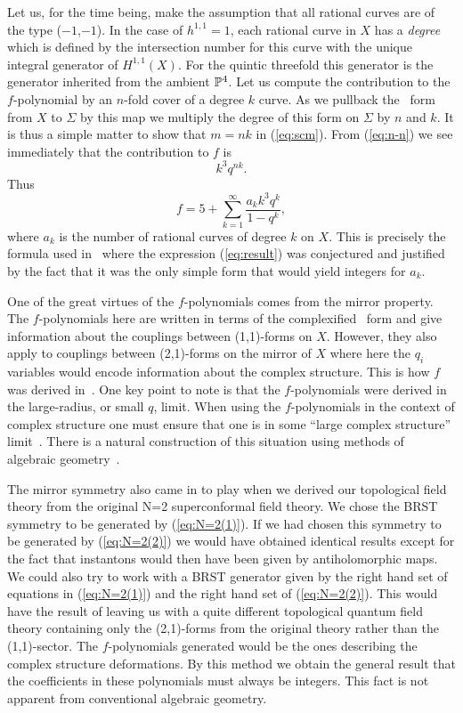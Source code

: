 Let us, for the time being, make the assumption that all rational
curves are of the type ($-1$,$-1$).
In the case of $h^{1,1}=1$, each rational curve in $X$ has a {\em
degree\/} which is defined by the intersection number for this curve
with the unique integral generator of $H^{1,1}(X)$. For the quintic
threefold this generator is the generator inherited from the ambient
$\Bbb{P}^{4}$.  Let us compute the
contribution to the $f$-polynomial by an $n$-fold cover of a degree
$k$ curve. As we pullback the \K\ form from $X$ to $\Sigma$ by this
map we multiply the degree of this form on $\Sigma$ by $n$ and $k$. It
is thus a simple matter to show that $m=nk$ in (\ref{eq:scm}). From
(\ref{eq:n-n}) we see immediately that the contribution to $f$ is
\begin{equation}
  k^3q^{nk}. \label{eq:result}
\end{equation}
Thus
\begin{equation}
  f = 5+\sum_{k=1}^\infty\frac{a_kk^3q^k}{1-q^k},
\end{equation}
where $a_k$ is the number of rational curves of degree $k$ on $X$.
This is precisely the formula used in~\cite{Cand:rat} where the
expression (\ref{eq:result}) was conjectured and
justified by the fact that it was the
only simple form that would yield integers for $a_k$.

One of the great virtues of the $f$-polynomials comes from the mirror
property. The $f$-polynomials here are written in terms of the
complexified \K\ form and give information about the couplings between
(1,1)-forms on $X$. However, they also apply to couplings between
(2,1)-forms on the mirror of $X$ where here the $q_i$ variables would encode
information about the complex structure. This is how $f$ was derived
in~\cite{Cand:rat}. One key point to note is that the $f$-polynomials
were derived in the large-radius, or small $q$, limit. When using the
$f$-polynomials in the context of complex structure one must ensure
that one is in some ``large complex structure'' limit~\cite{AL:qag}. There
is a natural construction of this situation using methods of algebraic
geometry~\cite{Mor:math}.

The mirror symmetry also came in to play when we derived our
topological field theory from the original N=2 superconformal field
theory. We chose the BRST symmetry to be generated by
(\ref{eq:N=2(1)}). If we had chosen this symmetry to be generated
by (\ref{eq:N=2(2)}) we would have obtained identical results except for the
fact that instantons would then have been given by antiholomorphic maps. We
could also try to work with a BRST generator given by the right hand
set of equations in (\ref{eq:N=2(1)}) and the right hand set of
(\ref{eq:N=2(2)}). This would have the result of leaving us with a
quite different topological quantum
field theory containing only the (2,1)-forms from
the original theory rather than the (1,1)-sector. The $f$-polynomials
generated would be the ones describing the complex structure
deformations. By this method we obtain the general result that the
coefficients in these polynomials must always be integers. This fact
is not apparent from conventional algebraic geometry.

